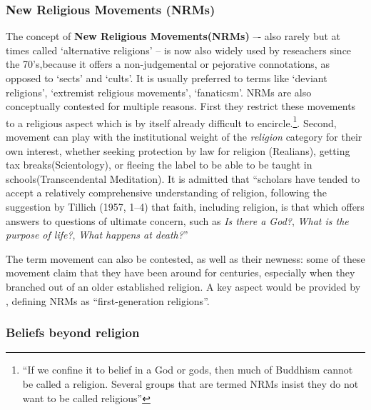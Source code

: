 \subsubsection{New Religious Movements (NRMs)}
The concept of \textbf{New Religious Movements(NRMs)} –- also rarely but at times called `alternative religions' -- is now also widely used by reseachers since the 70's,because it offers a non-judgemental or pejorative connotations, as opposed to `sects' and `cults'. It is usually preferred to terms like `deviant religions', `extremist religious movements', `fanaticsm'.
NRMs are also conceptually contested for multiple reasons. First they restrict these movements to a religious aspect which is by itself already difficult to encircle.\footnote{\enquote{If we confine it to belief in a God or gods, then much of Buddhism cannot be called a religion. Several groups that are termed NRMs insist they do not want to be called religious}\autocite[pp.237]{barkerNotsonewReligiousMovements2014}}. Second, movement can play with the institutional weight of the \textit{religion} category for their own interest, whether seeking protection by law for religion (Realians), getting tax breaks(Scientology), or fleeing the label to be able to be taught in schools(Transcendental Meditation).
It is admitted that \enquote{scholars have tended to accept a relatively comprehensive understanding of religion, following the suggestion by Tillich (1957, 1–4) that faith, including religion, is that which offers answers to questions of ultimate concern, such as \textit{Is there a God?}, \textit{What is the purpose of life?}, \textit{What happens at death?}}\autocite[pp.237]{barkerNotsonewReligiousMovements2014}

The term movement can also be contested, as well as their newness: some of these movement claim that they have been around for centuries, especially when they branched out of an older established religion. A key aspect would be provided by \citeauthor{barkerNotsonewReligiousMovements2014}, defining NRMs as \enquote{first-generation religions}\autocite[pp.239]{barkerNotsonewReligiousMovements2014}.

\subsubsection{Beliefs beyond religion}

